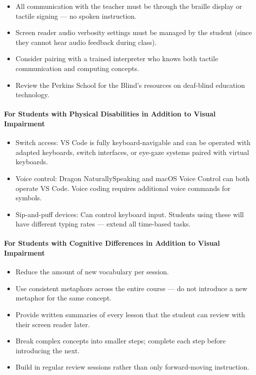 \documentclass[
  justified,
  openright,
]{tufte-book}
\let\subsection\paragraph
\let\paragraph\paragraph
\let\subsection\paragraph
\let\paragraph\paragraph
\providecommand{\tightlist}{%
  \setlength{\itemsep}{0pt}\setlength{\parskip}{0pt}}
\begin{document}
\begin{itemize}
\tightlist
\item
  All communication with the teacher must be through the braille display
  or tactile signing --- no spoken instruction.
\item
  Screen reader audio verbosity settings must be managed by the student
  (since they cannot hear audio feedback during class).
\item
  Consider pairing with a trained interpreter who knows both tactile
  communication and computing concepts.
\item
  Review the Perkins School for the Blind's resources on deaf-blind
  education technology.
\end{itemize}

\subsection{For Students with Physical Disabilities in Addition to
Visual
Impairment}\label{for-students-with-physical-disabilities-in-addition-to-visual-impairment}

\begin{itemize}
\tightlist
\item
  Switch access: VS Code is fully keyboard-navigable and can be operated
  with adapted keyboards, switch interfaces, or eye-gaze systems paired
  with virtual keyboards.
\item
  Voice control: Dragon NaturallySpeaking and macOS Voice Control can
  both operate VS Code. Voice coding requires additional voice commands
  for symbols.
\item
  Sip-and-puff devices: Can control keyboard input. Students using these
  will have different typing rates --- extend all time-based tasks.
\end{itemize}

\subsection{For Students with Cognitive Differences in Addition to
Visual
Impairment}\label{for-students-with-cognitive-differences-in-addition-to-visual-impairment}

\begin{itemize}
\tightlist
\item
  Reduce the amount of new vocabulary per session.
\item
  Use consistent metaphors across the entire course --- do not introduce
  a new metaphor for the same concept.
\item
  Provide written summaries of every lesson that the student can review
  with their screen reader later.
\item
  Break complex concepts into smaller steps; complete each step before
  introducing the next.
\item
  Build in regular review sessions rather than only forward-moving
  instruction.
\end{itemize}
\end{document}
